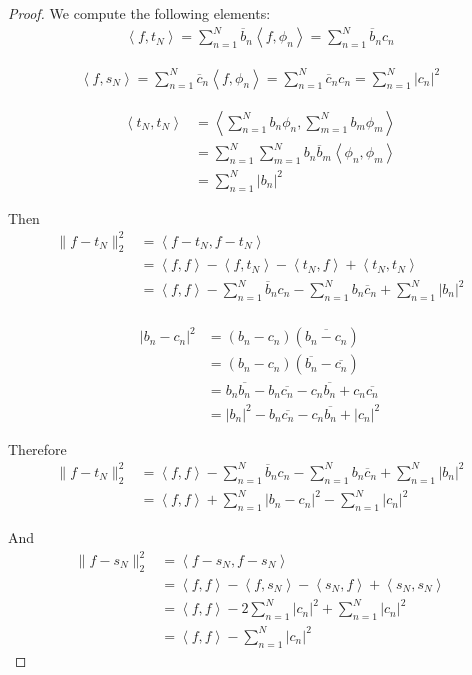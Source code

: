 \documentclass[11pt]{article}
\numberwithin{equation}{section}
\theoremstyle{definition}
\theoremstyle{definition}
\newcommand\angles[1]{\left\langle #1 \right\rangle}
\newcommand\abs[1]{\left| #1 \right|}
\newcommand\norm[1]{\lVert#1\rVert}
\newcommand{\1}{\mathbbm 1}
\begin{document}
\begin{proof}
We compute the following elements:
\begin{align*}
	\angles{f,t_N} = \sum_{n=1}^N \overline{b}_n \angles{f,\phi_n} = \sum_{n=1}^N \overline{b}_n c_n
\end{align*}

\begin{align*}
	\angles{f,s_N} = \sum_{n=1}^N \overline{c}_n \angles{f,\phi_n} = \sum_{n=1}^N \overline{c}_n c_n = \sum_{n=1}^N \abs{c_n}^2
\end{align*}


\begin{align*}
	\angles{t_N,t_N} &= \angles{\sum_{n=1}^N b_n\phi_n, \sum_{m=1}^N b_m \phi_m} \\
	&= \sum_{n=1}^N \sum_{m=1}^N b_n \overline{b}_m \angles{\phi_n, \phi_m} \\
	&= \sum_{n=1}^N \abs{b_n}^2 \tag{$(\phi_n)_n$ orthonormal}
\end{align*}

Then
\begin{align*}
	\norm{f-t_N}^2_2 &= \angles{f-t_N,f-t_N} \\
	&= \angles{f,f} - \angles{f,t_N} - \angles{t_N,f} + \angles{t_N,t_N} \\
	&= \angles{f,f} - \sum_{n=1}^N \overline{b}_n c_n - \sum_{n=1}^N b_n \overline{c}_n + \sum_{n=1}^N \abs{b_n}^2 \\
\end{align*}

\begin{align*}
	\abs{b_n - c_n}^2 &= (b_n - c_n)(\overline{b_n - c_n}) \\
	&= (b_n - c_n)(\overline{b_n} - \overline{c_n}) \\
	&= b_n \overline{b_n} - b_n \overline{c_n} - c_n \overline{b_n} + c_n \overline{c_n} \\
	&= \abs{b_n}^2 - b_n \overline{c_n} - c_n \overline{b_n} + \abs{c_n}^2
\end{align*}

Therefore
\begin{align*}
	\norm{f-t_N}^2_2 &= \angles{f,f} - \sum_{n=1}^N \overline{b}_n c_n - \sum_{n=1}^N b_n \overline{c}_n + \sum_{n=1}^N \abs{b_n}^2 \\
	&= \angles{f,f} + \sum_{n=1}^N \abs{b_n - c_n}^2 - \sum_{n=1}^N \abs{c_n}^2 
\end{align*}

And
\begin{align*}
	\norm{f-s_N}^2_2 &= \angles{f-s_N,f-s_N} \\
	&= \angles{f,f} - \angles{f,s_N} - \angles{s_N,f} + \angles{s_N,s_N} \\
	&= \angles{f,f} - 2 \sum_{n=1}^N \abs{c_n}^2 + \sum_{n=1}^N \abs{c_n}^2 \\
	&= \angles{f,f} - \sum_{n=1}^N \abs{c_n}^2
\end{align*}


\end{proof}
\end{document}
